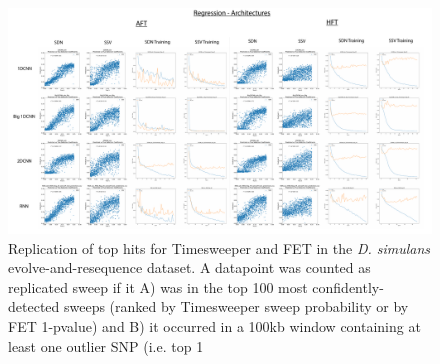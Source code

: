 \begin{figure}
    \centering
    \includegraphics[width=\textwidth]{figures/ap1/S9_Architectures_Regression.pdf}
    \caption[Replication of top hits for Timesweeper and FET in the D.]{Replication of top hits for Timesweeper and FET in the \textit{D. simulans} evolve-and-resequence dataset. A datapoint was counted as replicated sweep if it A) was in the top 100 most confidently-detected sweeps (ranked by Timesweeper sweep probability or by FET 1-pvalue) and B) it occurred in a 100kb window containing at least one outlier SNP (i.e. top 1%
}
    \label{fig:S9_Architectures_Regression}
\end{figure}

